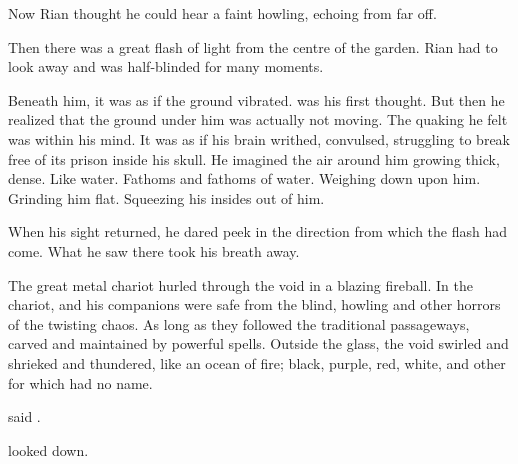 Now Rian thought he could hear a faint howling, echoing from far off. 


Then there was a great flash of light from the centre of the garden. 
Rian had to look away and was half-blinded for many moments. 

Beneath him, it was as if the ground vibrated. 
 was his first thought. 
But then he realized that the ground under him was actually not moving. 
The quaking he felt was within his mind. 
It was as if his brain writhed, convulsed, struggling to break free of its prison inside his skull. 
He imagined the air around him growing thick, dense. 
Like water. 
Fathoms and fathoms of water. 
Weighing down upon him. 
Grinding him flat. 
Squeezing his insides out of him. 

When his sight returned, he dared peek in the direction from which the flash had come. 
What he saw there took his breath away.

        


\begin{comment}
  \subsection{Resphain travel}
\end{comment}
The great metal chariot hurled through the void in a blazing fireball. 
In the chariot, \Teshrial and his companions were safe from the blind, howling \daimonia and other horrors of the twisting chaos. 
As long as they followed the traditional passageways, carved and maintained by powerful spells. 
Outside the glass, the void swirled and shrieked and thundered, like an ocean of fire; black, purple, red, white, and other \colours for which \Teshrial had no name. 

 said \Ganethed. 

\Achsah looked down.

